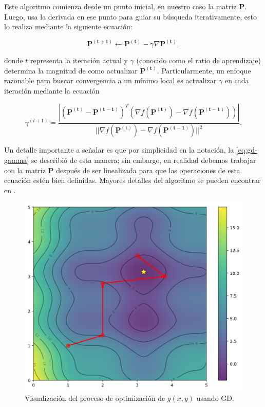 Este algoritmo comienza desde un punto inicial, en nuestro caso la matriz $\boldsymbol{P}$.
Luego, usa la derivada en ese punto para guiar su búsqueda iterativamente, 
esto lo realiza mediante la siguiente ecuación:

\begin{equation}
  \boldsymbol{P^{(t+1)}} \gets \boldsymbol{P^{(t)}} - \gamma \nabla \boldsymbol{P^{(t)}},
  \label{eq:gd-point}
\end{equation}

donde $t$ representa la iteración actual y $\gamma$ (conocido como el ratio de aprendizaje)
determina la magnitud de como actualizar $\boldsymbol{P^{(t)}}$. 
Particularmente, un enfoque razonable para buscar convergencia a 
un mínimo local es actualizar $\gamma$ en cada iteración mediante la ecuación

\begin{equation}
  \gamma^{(t+1)} = \frac{|(\boldsymbol{P^{(t)}}-\boldsymbol{P^{(t-1)}})^T(\nabla f(\boldsymbol{P^{(t)}})-\nabla f(\boldsymbol{P^{(t-1)}}))|}
  {||\nabla f(\boldsymbol{P^{(t)}})-\nabla f(\boldsymbol{P^{(t-1)}})||^2}.
  \label{eq:gd-gamma}
\end{equation}

Un detalle importante a señalar es que por simplicidad en la notación, 
la \autoref{eq:gd-gamma} se describió de esta manera;
sin embargo, en realidad debemos trabajar con la matriz $\boldsymbol{P}$ después de ser linealizada
para que las operaciones de esta ecuación estén bien definidas.
Mayores detalles del algoritmo se pueden encontrar en \cite{Demidova2020}.

\begin{figure}[ht]
  \centering
  \includegraphics[scale=0.5]{image/theory/GD.png}
   \caption{Visualización del proceso de optimización de $g(x, y)$ usando GD.}
  \label{fig:gd}
\end{figure}

